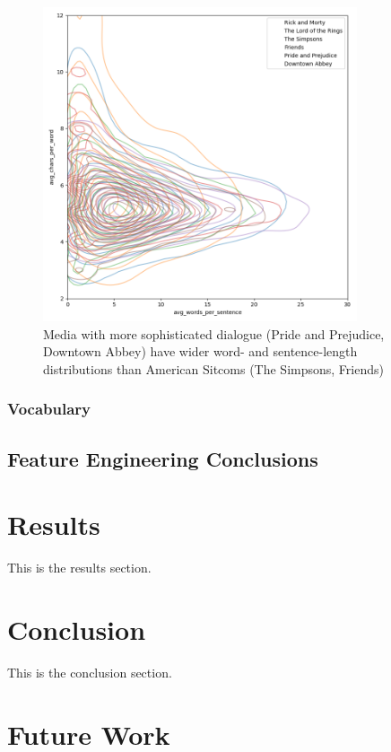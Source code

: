 \documentclass{article}
\newcommand{\largeimagewidth}{350}
\begin{document}
\begin{titlepage}
\begin{figure}[H]
\centering
\includegraphics[width=\largeimagewidth]{images/3d_kde_test_final.png}
\caption{Media with more sophisticated dialogue (Pride and Prejudice, Downtown Abbey) have wider word- and sentence-length distributions than American Sitcoms (The Simpsons, Friends)}
\end{figure}

\subsubsection{Vocabulary}
\subsection{Feature Engineering Conclusions}

\section{Results}
This is the results section.

\section{Conclusion}
This is the conclusion section.

\section{Future Work}


\end{titlepage}
\end{document}
